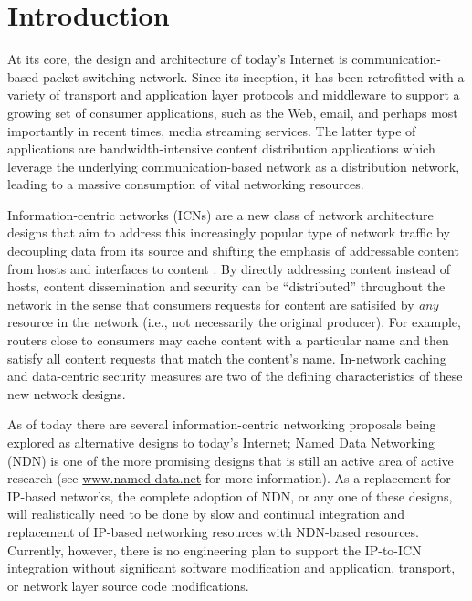 \section{Introduction}
At its core, the design and architecture of today's Internet is communication-based packet switching network. Since its inception, it has been retrofitted with a variety of transport and application layer protocols and middleware to support a growing set of consumer applications, such as the Web, email, and perhaps most importantly in recent times, media streaming services. The latter type of applications are bandwidth-intensive content distribution applications which leverage the underlying communication-based network as a distribution network, leading to a massive consumption of vital networking resources. 

Information-centric networks (ICNs) are a new class of network architecture designs that aim to address this increasingly popular type of network traffic by decoupling data from its source and shifting the emphasis of addressable content from hosts and interfaces to content \cite{first}. By directly addressing content instead of hosts, content dissemination and security can be ``distributed'' throughout the network in the sense that consumers requests for content are satisifed by \emph{any} resource in the network (i.e., not necessarily the original producer). For example, routers close to consumers may cache content with a particular name and then satisfy all content requests that match the content's name. In-network caching and data-centric security measures are two of the defining characteristics of these new network designs. 

As of today there are several information-centric networking proposals being explored as alternative designs to today's Internet; Named Data Networking (NDN) \cite{NDNtech} is one of the more promising designs that is still an active area of active research (see \url{www.named-data.net} for more information). As a replacement for IP-based networks, the complete adoption of NDN, or any one of these designs, will realistically need to be done by slow and continual integration and replacement of IP-based networking resources with NDN-based resources. Currently, however, there is no engineering plan to support the IP-to-ICN integration without significant software modification and application, transport, or network layer source code modifications.

